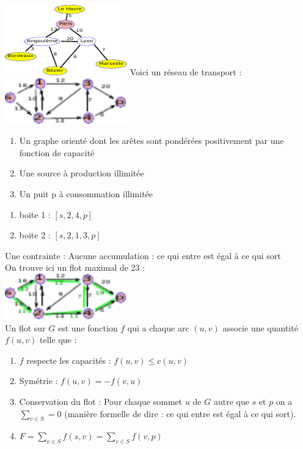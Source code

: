 \includegraphics[width=200px]{Images/fig29.pdf}
 Voici un réseau de transport : \\
\includegraphics[width=200px]{Images/fig30.pdf}\\
\begin{enumerate}
	\item Un graphe orienté dont les arêtes sont pondérées positivement par une fonction de capacité
	\item Une source à production illimitée
	\item Un puit p à consommation illimitée
\end{enumerate}

\begin{enumerate}
	\item boite 1 : $[s,2,4,p]$
	\item boite 2 : $[s,2,1,3,p]$
\end{enumerate}
Une contrainte : Aucune accumulation : ce qui entre est égal à ce qui sort\\
On trouve ici un flot maximal de 23 : \\
\includegraphics[width=200px]{Images/fig31.pdf}\\

 Un flot sur $G$ est une fonction $f$ qui a chaque arc $(u,v)$ associe une quantité $f(u,v)$  telle que :
\begin{enumerate}
	\item $f$ respecte les capacités : $f(u,v) \leq c(u,v)$
	\item Symétrie : $f(u,v) = -f(v,u)$
	\item Conservation du flot : Pour chaque sommet $u$ de $G$ autre que $s$ et $p$ on a $\displaystyle{\sum_{v\in S} = 0}$ (manière formelle de dire : ce qui entre est égal à ce qui sort).
	\item {} $F = \displaystyle{\sum_{v\in S} f(s,v)} = \displaystyle{\sum_{v\in S} f(v,p)}$
\end{enumerate}

